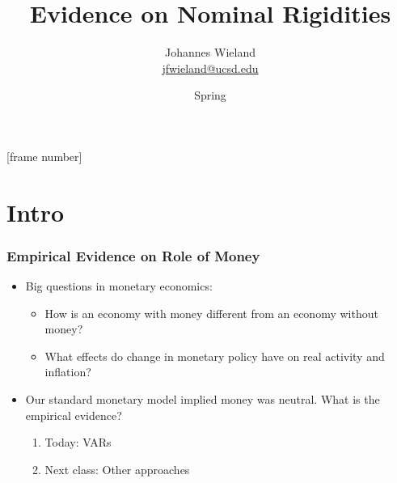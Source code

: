 \documentclass[english,xcolor=svgnames]{beamer}
\begin{document}
\title{Evidence on Nominal Rigidities}
\vspace{1cm}
\author[shortname]{
\begin{tabular}{c}
	Johannes Wieland \\ 
	\footnotesize \href{mailto:jfwieland@ucsd.edu}{jfwieland@ucsd.edu}  \\ 
\end{tabular}
}

\date{Spring \the\year}

\makebeamertitle
{}[frame number]{}

\addtocounter{framenumber}{-1}








\section{Intro}
\begin{frame}
\frametitle{Empirical Evidence on Role of Money}
\begin{itemize}
	\item  Big questions in monetary economics:
	\begin{itemize}
		\item How is an economy with money different from an economy without money?
		\item What effects do change in monetary policy have on real activity and inflation?
	\end{itemize}
	\item Our standard monetary model implied money was neutral. What is the empirical evidence?
	\begin{enumerate}
		\item Today: VARs
		\item Next class: Other approaches
	\end{enumerate}
\end{itemize}
\end{frame}
\end{document}
